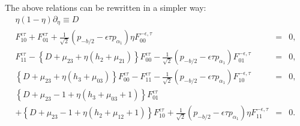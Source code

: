 \documentclass[a4paper,12pt]{article}
\newcommand{\ep}{{\epsilon}}
\begin{document}
 The above relations can be rewritten in a simpler way:
\begin{equation}
\begin{array}{rcl}
  \eta(1-\eta)\partial_\eta \equiv D \\
  F_{10}^{\ep\tau}+F_{01}^{\ep\tau}
 +\frac{1}{\sqrt{2}}(p_{-b/2}-\ep\tau p_{\alpha_1})\eta F_{00}^{-\ep,\tau}
 &=& 0, \\
  F_{11}^{\ep\tau}
 -\left\{D+\mu_{23}+\eta(h_2+\mu_{21})\right\}
  F_{00}^{\ep\tau}
 -\frac{1}{\sqrt{2}}(p_{-b/2}-\ep\tau p_{\alpha_1})F_{01}^{-\ep,\tau}
 &=& 0, \\
  \left\{D+\mu_{23}+\eta(h_3+\mu_{03})\right\}
   F_{00}^{\ep\tau}
 -F_{11}^{\ep\tau}
 -\frac{1}{\sqrt{2}}(p_{-b/2}-\ep\tau p_{\alpha_1})F_{10}^{-\ep,\tau}
 &=& 0, \\
  \left\{D+\mu_{23}-1
         +\eta(h_3+\mu_{03}+1)\right\}F_{01}^{\ep\tau}
 && \\
 +\left\{D+\mu_{23}-1+\eta(h_2+\mu_{12}+1)\right\}
   F_{10}^{\ep\tau}
 +\frac{1}{\sqrt{2}}(p_{-b/2}-\ep\tau p_{\alpha_1})
  \eta F_{11}^{-\ep,\tau}
 &=& 0.
\end{array}
\label{SCW}
\end{equation}
\end{document}
